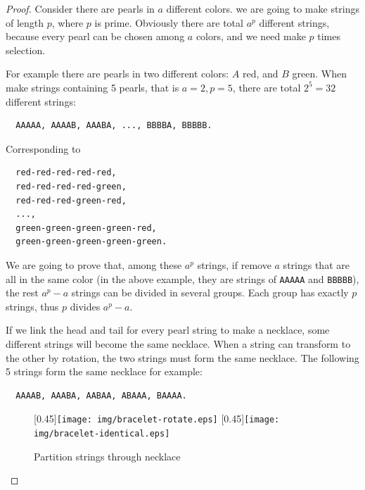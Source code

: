 \documentclass{article}
\begin{document}
\begin{proof}
Consider there are pearls in $a$ different colors. we are going to make strings of length $p$, where $p$ is prime. Obviously there are total $a^p$ different strings, because every pearl can be chosen among $a$ colors, and we need make $p$ times selection.

For example there are pearls in two different colors: $A$ red, and $B$ green. When make strings containing 5 pearls, that is $a = 2, p = 5$, there are total $2^5 = 32$ different strings:

\begin{verbatim}
  AAAAA, AAAAB, AAABA, ..., BBBBA, BBBBB.
\end{verbatim}

Corresponding to

\begin{verbatim}
  red-red-red-red-red,
  red-red-red-red-green,
  red-red-red-green-red,
  ...,
  green-green-green-green-red,
  green-green-green-green-green.
\end{verbatim}

We are going to prove that, among these $a^p$ strings, if remove $a$ strings that are all in the same color (in the above example, they are strings of \texttt{AAAAA} and \texttt{BBBBB}), the rest $a^p - a$ strings can be divided in several groups. Each group has exactly $p$ strings, thus $p$ divides $a^p - a$.

If we link the head and tail for every pearl string to make a necklace, some different strings will become the same necklace. When a string can transform to the other by rotation, the two strings must form the same necklace. The following 5 strings form the same necklace for example:

\begin{verbatim}
  AAAAB, AAABA, AABAA, ABAAA, BAAAA.
\end{verbatim}

\begin{figure}[htbp]
  \centering
  [0.45\linewidth]{\texttt{[image: img/bracelet-rotate.eps]}} \quad
  [0.45\linewidth]{\texttt{[image: img/bracelet-identical.eps]}}
  \caption{Partition strings through necklace}
  \label{fig:bracelet}
\end{figure}


\end{proof}
\end{document}
